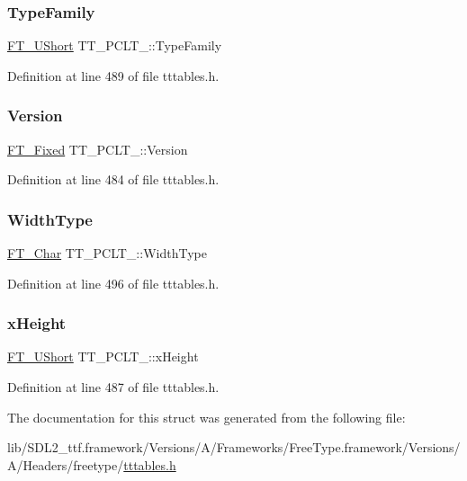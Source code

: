 \subsubsection{\texorpdfstring{TypeFamily}{TypeFamily}}
{\footnotesize\ttfamily \mbox{\hyperlink{fttypes_8h_a937f6c17cf5ffd09086d8610c37b9f58}{F\+T\+\_\+\+U\+Short}} T\+T\+\_\+\+P\+C\+L\+T\+\_\+\+::\+Type\+Family}



Definition at line 489 of file tttables.\+h.

\mbox{\label{struct_t_t___p_c_l_t___a83429ca782a731b38d67e604809e278c}} 
\subsubsection{\texorpdfstring{Version}{Version}}
{\footnotesize\ttfamily \mbox{\hyperlink{fttypes_8h_a5f5a679cc09f758efdd0d1c5feed3c3d}{F\+T\+\_\+\+Fixed}} T\+T\+\_\+\+P\+C\+L\+T\+\_\+\+::\+Version}



Definition at line 484 of file tttables.\+h.

\mbox{\label{struct_t_t___p_c_l_t___ad6613ad7556599343f999a7d27a0f1d0}} 
\subsubsection{\texorpdfstring{WidthType}{WidthType}}
{\footnotesize\ttfamily \mbox{\hyperlink{fttypes_8h_a0f851552b050883885f0a0855771f39d}{F\+T\+\_\+\+Char}} T\+T\+\_\+\+P\+C\+L\+T\+\_\+\+::\+Width\+Type}



Definition at line 496 of file tttables.\+h.

\mbox{\label{struct_t_t___p_c_l_t___a4b2f3e6bf6508eacbff5e4eb16745872}} 
\subsubsection{\texorpdfstring{xHeight}{xHeight}}
{\footnotesize\ttfamily \mbox{\hyperlink{fttypes_8h_a937f6c17cf5ffd09086d8610c37b9f58}{F\+T\+\_\+\+U\+Short}} T\+T\+\_\+\+P\+C\+L\+T\+\_\+\+::x\+Height}



Definition at line 487 of file tttables.\+h.



The documentation for this struct was generated from the following file\+:\begin{DoxyCompactItemize}
\item 
lib/\+S\+D\+L2\+\_\+ttf.\+framework/\+Versions/\+A/\+Frameworks/\+Free\+Type.\+framework/\+Versions/\+A/\+Headers/freetype/\mbox{\hyperlink{tttables_8h}{tttables.\+h}}\end{DoxyCompactItemize}

